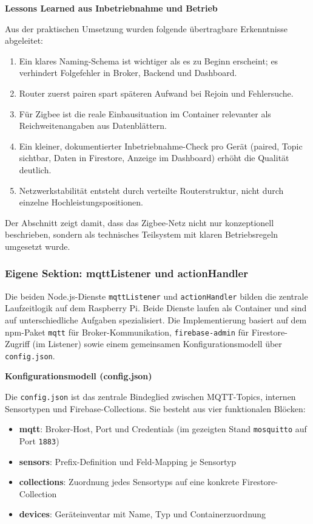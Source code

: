 \textbf{Lessons Learned aus Inbetriebnahme und Betrieb}

Aus der praktischen Umsetzung wurden folgende übertragbare Erkenntnisse abgeleitet:

\begin{enumerate}
    \item Ein klares Naming-Schema ist wichtiger als es zu Beginn erscheint; es verhindert Folgefehler in Broker, Backend und Dashboard.
    \item Router zuerst pairen spart späteren Aufwand bei Rejoin und Fehlersuche.
    \item Für Zigbee ist die reale Einbausituation im Container relevanter als Reichweitenangaben aus Datenblättern.
    \item Ein kleiner, dokumentierter Inbetriebnahme-Check pro Gerät (paired, Topic sichtbar, Daten in Firestore, Anzeige im Dashboard) erhöht die Qualität deutlich.
    \item Netzwerkstabilität entsteht durch verteilte Routerstruktur, nicht durch einzelne Hochleistungspositionen.
\end{enumerate}

Der Abschnitt zeigt damit, dass das Zigbee-Netz nicht nur konzeptionell beschrieben, sondern als technisches Teilsystem mit klaren Betriebsregeln umgesetzt wurde.

\subsubsection{Eigene Sektion: mqttListener und actionHandler}

Die beiden Node.js-Dienste \texttt{mqttListener} und \texttt{actionHandler} bilden die zentrale Laufzeitlogik auf dem Raspberry Pi. Beide Dienste laufen als Container und sind auf unterschiedliche Aufgaben spezialisiert. Die Implementierung basiert auf dem npm-Paket \texttt{mqtt} für Broker-Kommunikation, \texttt{firebase-admin} für Firestore-Zugriff (im Listener) sowie einem gemeinsamen Konfigurationsmodell über \texttt{config.json}.

\textbf{Konfigurationsmodell (config.json)}


Die \texttt{config.json} ist das zentrale Bindeglied zwischen MQTT-Topics, internen Sensortypen und Firebase-Collections. Sie besteht aus vier funktionalen Blöcken:

\begin{itemize}
    \item \textbf{mqtt}: Broker-Host, Port und Credentials (im gezeigten Stand \texttt{mosquitto} auf Port \texttt{1883})
    \item \textbf{sensors}: Prefix-Definition und Feld-Mapping je Sensortyp
    \item \textbf{collections}: Zuordnung jedes Sensortyps auf eine konkrete Firestore-Collection
    \item \textbf{devices}: Geräteinventar mit Name, Typ und Containerzuordnung
\end{itemize}

